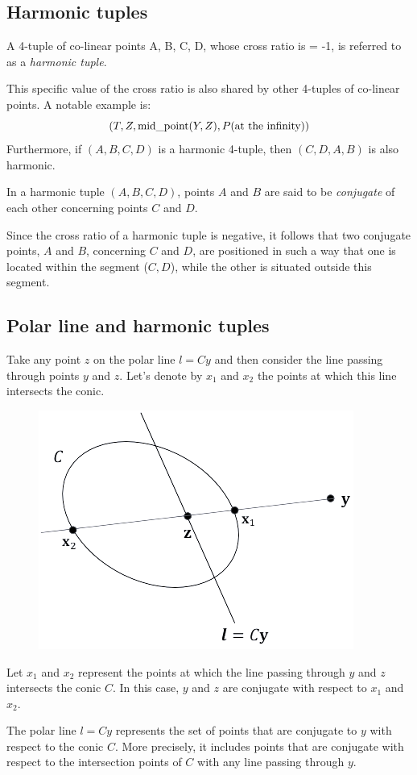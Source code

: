 \subsection*{Harmonic tuples}
\begin{definition}
    A 4-tuple of co-linear points A, B, C, D, whose cross ratio is = -1, is referred to as a \emph{harmonic tuple}. 
\end{definition}
This specific value of the cross ratio is also shared by other 4-tuples of co-linear points. 
A notable example is:
\[\left( T,Z,\textnormal{mid\_point}(Y,Z),P(\textnormal{at the infinity}) \right)\]
Furthermore, if $(A, B, C, D)$ is a harmonic 4-tuple, then $(C, D, A, B)$ is also harmonic. 
\begin{definition}
    In a harmonic tuple $(A, B, C, D)$, points $A$ and $B$ are said to be \emph{conjugate} of each other concerning points $C$ and $D$.
\end{definition}
Since the cross ratio of a harmonic tuple is negative, it follows that two conjugate points, $A$ and $B$, concerning $C$ and $D$, are positioned in such a way that one is located within the segment ($C, D$), while the other is situated outside this segment.

\subsection*{Polar line and harmonic tuples}
Take any point $z$ on the polar line $l=Cy$ and then consider the line passing through points $y$ and $z$. 
Let's denote by $x_1$ and $x_2$ the points at which this line intersects the conic.    
\begin{figure}[H]
    \centering
    \includegraphics[width=0.25\linewidth]{images/polarharmonic.png}
\end{figure}
\begin{theorem}
    Let $x_1$ and $x_2$ represent the points at which the line passing through $y$ and $z$ intersects the conic $C$. 
    In this case, $y$ and $z$ are conjugate with respect to $x_1$ and $x_2$.     
\end{theorem}
The polar line $l=Cy$ represents the set of points that are conjugate to $y$ with respect to the conic $C$.
More precisely, it includes points that are conjugate with respect to the intersection points of $C$ with any line passing through $y$.

